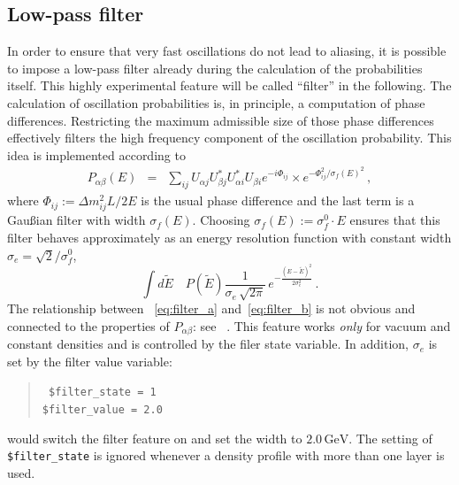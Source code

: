 \subsection{Low-pass filter}

In order to ensure that very fast oscillations do not lead to 
aliasing,
it is possible to impose a low-pass filter already during the calculation
of the probabilities itself. This highly
experimental feature will be called ``filter'' in the following. 
The calculation of oscillation
probabilities is, in principle, a computation of phase differences. Restricting the maximum admissible size of those phase differences effectively filters
the high frequency component of the oscillation probability. This idea is
implemented according to
\begin{eqnarray}
\label{eq:filter_a}
P_{\alpha\beta}(E)&=&\sum_{ij}
U_{\alpha j} U^*_{\beta j} U^*_{\alpha i} U_{\beta i} 
e^{-i\Phi_{ij}}\times 
e^{ -\Phi_{ij}^2/\sigma_f(E)^2 }\,,
\end{eqnarray}
where $\Phi_{ij}:=\Delta m_{ij}^2 L/2E$ is the usual phase difference and
the last term is a Gau\ss ian filter with width $\sigma_f(E)$. Choosing
$\sigma_f(E):=\sigma_f^0 \cdot E$ ensures that this filter behaves 
approximately as an energy resolution function with constant width 
$\sigma_e=\sqrt{2}/\sigma_f^0$, \ie\
\begin{equation}
\label{eq:filter_b}
\int d\tilde E\quad P(\tilde E) \frac{1}{\sigma_e\,\sqrt{2\pi}}\,
e^{-\frac{(E-\tilde E)^2}{2\sigma^2_e}}\,.
\end{equation}
The relationship between \eqs~\eqref{eq:filter_a} and~\eqref{eq:filter_b}
is not obvious and connected to the properties of $P_{\alpha\beta}$: 
see \Refs~\cite{Kiers:1996zj,Giunti:2003ax}. This feature works \emph{only} 
for vacuum and constant densities and is controlled
by the filer state variable. In addition, $\sigma_e$ is set by the filter value variable:
\index{aedl}{filter state@{\tt \$filter\_state}}
\begin{quote}
{\tt
\$filter\_state = 1\\
\$filter\_value = 2.0\\
}
\end{quote}
would switch the filter feature on and set the width to $2.0\,\mathrm{GeV}$.
The setting of {\tt \$filter\_state} is ignored whenever a density profile
with more than one layer is used. 

